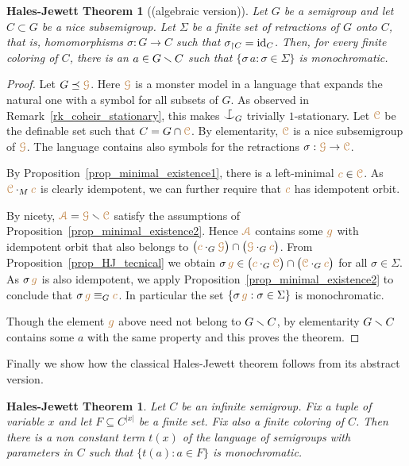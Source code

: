 \documentclass[creche.tex]{subfiles}
\begin{document}
\theoremstyle{mio}
\newtheorem{HalesJewett}[thm]{Hales-Jewett Theorem}
\begin{HalesJewett}[(algebraic version)]\label{thm_abstract_HJ}
Let $G$ be a semigroup and let $C\subset G$ be a nice subsemigroup.
Let $\Sigma$ be a finite set of retractions of $G$ onto $C$, that is, 
homomorphisms $\sigma:G\to C$ such that $\sigma_{\restriction C}={\rm id}_C$.
Then, for every finite coloring of $C$,
there is an $a\in G\smallsetminus C$ such that $\{\sigma\,a:\sigma\in\Sigma\}$ is monochromatic.
\end{HalesJewett}

\begin{proof}
Let $G\preceq{\color{brown}\EuScript G}$.
Here ${\color{brown}\EuScript G}$ is a monster model in a language that expands the natural one with a symbol for all subsets of $G$.
As observed in Remark~\ref{rk_coheir_stationary}, 
this makes $\nonforkc_G$ trivially $1$-stationary.
Let ${\color{brown}\EuScript C}$ be the definable set such that $C=G\cap{\color{brown}\EuScript C}$.
By elementarity, ${\color{brown}\EuScript C}$ is a nice subsemigroup of ${\color{brown}\EuScript G}$.
The language contains also symbols for 
the retractions $\sigma:{\color{brown}\EuScript G}\to{\color{brown}\EuScript C}$.

By Proposition~\ref{prop_minimal_existence1}, there is a left-minimal ${\color{brown} c}\in{\color{brown}\EuScript C}$.
As ${\color{brown}\EuScript C}\cdot_M{\color{brown} c}$ is clearly idempotent, we can further require that ${\color{brown} c}$ has idempotent orbit.

By nicety, ${\color{brown}{\EuScript A}}={\color{brown}\EuScript G}\smallsetminus{\color{brown}\EuScript C}$ satisfy the assumptions of Proposition~\ref{prop_minimal_existence2}.
Hence ${\color{brown}{\EuScript A}}$ contains some ${\color{brown} g}$ with idempotent orbit that also belongs to 
$\big({\color{brown} c}\cdot_G{\color{brown}\EuScript G}\big)\cap\big({\color{brown}\EuScript G}\cdot_G{\color{brown} c}\big)$. 
From Proposition~\ref{prop_HJ_tecnical} we obtain
$\sigma\,{\color{brown} g}\in\big({\color{brown} c}\cdot_G{\color{brown}\EuScript C}\big)\cap\big({\color{brown}\EuScript C}\cdot_G{\color{brown} c}\big)$
for all $\sigma\in\Sigma$.
As $\sigma\,{\color{brown} g}$ is also idempotent, 
we apply Proposition~\ref{prop_minimal_existence2} to conclude that 
$\sigma\,{\color{brown} g}\equiv_G{\color{brown} c}$.
In particular the set $\{\sigma\,{\color{brown} g}:\sigma\in\Sigma\}$ is monochromatic. 

Though the element ${\color{brown} g}$ above need not belong to $G\smallsetminus C$,
by elementarity $G\smallsetminus C$ contains some $a$ with the same property and this proves the theorem.
\end{proof}

Finally we show how the classical Hales-Jewett theorem follows from its abstract version.

\begin{HalesJewett}\label{thm_HalesJewett}
Let $C$ be an infinite semigroup.
Fix a tuple of variable $x$ and let $F\subseteq C^{|x|}$ be a finite set.
Fix also a finite coloring of $C$.
Then there is a non constant term $t(x)$ 
of the language of semigroups with parameters in $C$
such that $\{ t(a): a\in F\}$ is monochromatic.
\end{HalesJewett}
\end{document}
